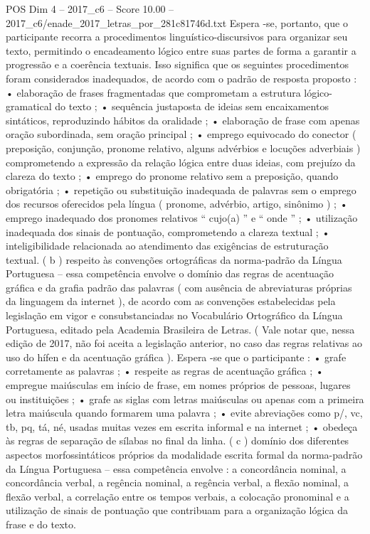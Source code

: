 \begin{textsample}{POS Dim 4 – 2017\_c6 – Score 10.00 – 2017\_c6/enade\_2017\_letras\_por\_281c81746d.txt}
Espera -se, portanto, que o participante recorra a procedimentos linguístico-discursivos para organizar seu texto, permitindo o encadeamento lógico entre suas partes de forma a garantir a progressão e a coerência textuais.
Isso significa que os seguintes procedimentos foram considerados inadequados, de acordo com o padrão de resposta proposto : • elaboração de frases fragmentadas que comprometam a estrutura lógico-gramatical do texto ; • sequência justaposta de ideias sem encaixamentos sintáticos, reproduzindo hábitos da oralidade ; • elaboração de frase com apenas oração subordinada, sem oração principal ; • emprego equivocado do conector ( preposição, conjunção, pronome relativo, alguns advérbios e locuções adverbiais ) comprometendo a expressão da relação lógica entre duas ideias, com prejuízo da clareza do texto ; • emprego do pronome relativo sem a preposição, quando obrigatória ; • repetição ou substituição inadequada de palavras sem o emprego dos recursos oferecidos pela língua ( pronome, advérbio, artigo, sinônimo ) ; • emprego inadequado dos pronomes relativos “ cujo(a) ” e “ onde ” ; • utilização inadequada dos sinais de pontuação, comprometendo a clareza textual ; • inteligibilidade relacionada ao atendimento das exigências de estruturação textual. ( b ) respeito às convenções ortográficas da norma-padrão da Língua Portuguesa – essa competência envolve o domínio das regras de acentuação gráfica e da grafia padrão das palavras ( com ausência de abreviaturas próprias da linguagem da internet ), de acordo com as convenções estabelecidas pela legislação em vigor e consubstanciadas no Vocabulário Ortográfico da Língua Portuguesa, editado pela Academia Brasileira de Letras. ( Vale notar que, nessa edição de 2017, não foi aceita a legislação anterior, no caso das regras relativas ao uso do hífen e da acentuação gráfica ).
Espera -se que o participante : • grafe corretamente as palavras ; • respeite as regras de acentuação gráfica ; • empregue maiúsculas em início de frase, em nomes próprios de pessoas, lugares ou instituições ; • grafe as siglas com letras maiúsculas ou apenas com a primeira letra maiúscula quando formarem uma palavra ; • evite abreviações como p/, vc, tb, pq, tá, né, usadas muitas vezes em escrita informal e na internet ; • obedeça às regras de separação de sílabas no final da linha. ( c ) domínio dos diferentes aspectos morfossintáticos próprios da modalidade escrita formal da norma-padrão da Língua Portuguesa – essa competência envolve : a concordância nominal, a concordância verbal, a regência nominal, a regência verbal, a flexão nominal, a flexão verbal, a correlação entre os tempos verbais, a colocação pronominal e a utilização de sinais de pontuação que contribuam para a organização lógica da frase e do texto.

\end{textsample}
